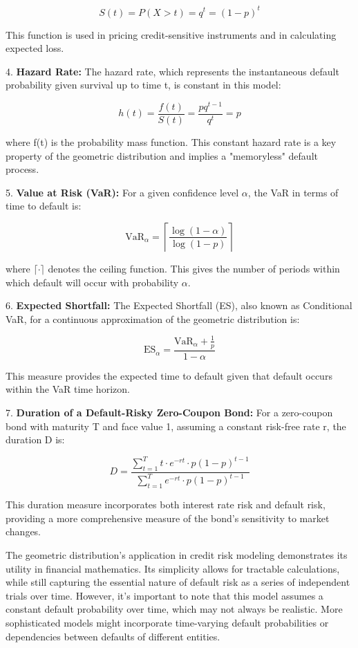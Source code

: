 \begin{example}
    \[
        S(t) = P(X > t) = q^t = (1-p)^t
    \]

    This function is used in pricing credit-sensitive instruments and in calculating expected loss.

    4. \textbf{Hazard Rate:}
    The hazard rate, which represents the instantaneous default probability given survival up to time t, is constant in this model:

    \[
        h(t) = \frac{f(t)}{S(t)} = \frac{pq^{t-1}}{q^t} = p
    \]

    where f(t) is the probability mass function. This constant hazard rate is a key property of the geometric distribution and implies a "memoryless" default process.

    5. \textbf{Value at Risk (VaR):}
    For a given confidence level $\alpha$, the VaR in terms of time to default is:

    \[
        \text{VaR}_{\alpha} = \left\lceil \frac{\log(1-\alpha)}{\log(1-p)} \right\rceil
    \]

    where  $\lceil \cdot \rceil$ denotes the ceiling function. This gives the number of periods within which default will occur with probability $\alpha$.

    6. \textbf{Expected Shortfall:}
    The Expected Shortfall (ES), also known as Conditional VaR, for a continuous approximation of the geometric distribution is:

    \[
        \text{ES}_{\alpha} = \frac{\text{VaR}_{\alpha} + \frac{1}{p}}{1-\alpha}
    \]

    This measure provides the expected time to default given that default occurs within the VaR time horizon.

    7. \textbf{Duration of a Default-Risky Zero-Coupon Bond:}
    For a zero-coupon bond with maturity T and face value 1, assuming a constant risk-free rate r, the duration D is:

    \[
        D = \frac{\sum_{t=1}^T t \cdot e^{-rt} \cdot p(1-p)^{t-1}}{\sum_{t=1}^T e^{-rt} \cdot p(1-p)^{t-1}}
    \]

    This duration measure incorporates both interest rate risk and default risk, providing a more comprehensive measure of the bond's sensitivity to market changes.

    The geometric distribution's application in credit risk modeling demonstrates its utility in financial mathematics. Its simplicity allows for tractable calculations, while still capturing the essential nature of default risk as a series of independent trials over time. However, it's important to note that this model assumes a constant default probability over time, which may not always be realistic. More sophisticated models might incorporate time-varying default probabilities or dependencies between defaults of different entities.
\end{example}


